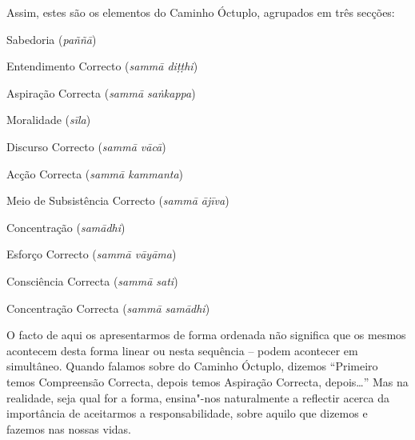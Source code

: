 \clearpage

Assim, estes são os elementos do Caminho Óctuplo, agrupados em três secções:

\bigskip

\noindent
Sabedoria (\emph{paññā})

\bigskip

\begin{packedenumerate}

\item Entendimento Correcto (\emph{sammā diṭṭhi})
\item Aspiração Correcta (\emph{sammā saṅkappa})

\end{packedenumerate}

\bigskip

\noindent
Moralidade (\emph{sīla})

\bigskip

\begin{packedenumerate}
\setcounter{enumi}{2}

\item Discurso Correcto (\emph{sammā vācā})
\item Acção Correcta (\emph{sammā kammanta})
\item Meio de Subsistência Correcto (\emph{sammā ājīva})

\end{packedenumerate}

\bigskip

\noindent
Concentração (\emph{samādhi})

\bigskip

\begin{packedenumerate}
\setcounter{enumi}{5}

\item Esforço Correcto (\emph{sammā vāyāma})
\item Consciência Correcta (\emph{sammā sati})
\item Concentração Correcta (\emph{sammā samādhi})

\end{packedenumerate}

\bigskip

O facto de aqui os apresentarmos de forma ordenada não significa que os mesmos
acontecem desta forma linear ou nesta sequência – podem acontecer em simultâneo.
Quando falamos sobre do Caminho Óctuplo, dizemos “Primeiro temos Compreensão
Correcta, depois temos Aspiração Correcta, depois\ldots{}” Mas na realidade, seja
qual for a forma, ensina"-nos naturalmente a reflectir acerca da importância de
aceitarmos a responsabilidade, sobre aquilo que dizemos e fazemos nas nossas
vidas.

